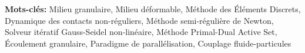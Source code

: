 \textbf{Mots-clés:} Milieu granulaire, Milieu déformable, Méthode des Éléments Discrets, Dynamique des contacts non-réguliers, Méthode semi-régulière de Newton, Solveur itératif Gauss-Seidel non-linéaire, Méthode Primal-Dual Active Set, Écoulement granulaire, Paradigme de parallélisation, Couplage fluide-particules
